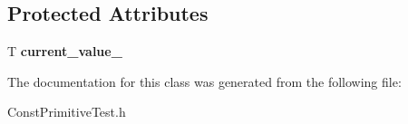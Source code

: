 \subsection*{Protected Attributes}
\begin{DoxyCompactItemize}
\item 
\mbox{\label{class_const_primitive_test_a63135178fde91f8b9dc557255d8cce85}} 
T {\bfseries current\+\_\+value\+\_\+}
\end{DoxyCompactItemize}


The documentation for this class was generated from the following file\+:\begin{DoxyCompactItemize}
\item 
Const\+Primitive\+Test.\+h\end{DoxyCompactItemize}
